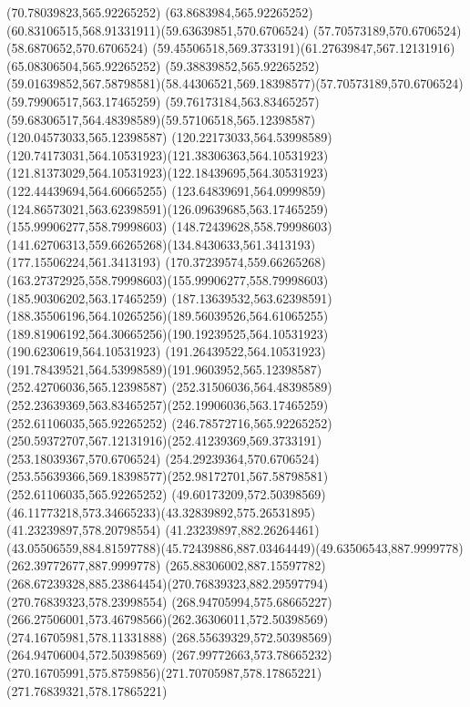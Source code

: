 {{		\lineto(70.78039823,565.92265252)
		\curveto(63.8683984,565.92265252)(60.83106515,568.91331911)(59.63639851,570.6706524)
		\closepath
		\moveto(57.70573189,570.6706524)
		\lineto(58.6870652,570.6706524)
		\curveto(59.45506518,569.3733191)(61.27639847,567.12131916)(65.08306504,565.92265252)
		\lineto(59.38839852,565.92265252)
		\curveto(59.01639852,567.58798581)(58.44306521,569.18398577)(57.70573189,570.6706524)
		\moveto(59.79906517,563.17465259)
		\curveto(59.76173184,563.83465257)(59.68306517,564.48398589)(59.57106518,565.12398587)
		\lineto(120.04573033,565.12398587)
		\curveto(120.22173033,564.53998589)(120.74173031,564.10531923)(121.38306363,564.10531923)
		\curveto(121.81373029,564.10531923)(122.18439695,564.30531923)(122.44439694,564.60665255)
		\curveto(123.64839691,564.0999859)(124.86573021,563.62398591)(126.09639685,563.17465259)
		\closepath
		\moveto(155.99906277,558.79998603)
		\curveto(148.72439628,558.79998603)(141.62706313,559.66265268)(134.8430633,561.3413193)
		\lineto(177.15506224,561.3413193)
		\curveto(170.37239574,559.66265268)(163.27372925,558.79998603)(155.99906277,558.79998603)
		\moveto(185.90306202,563.17465259)
		\curveto(187.13639532,563.62398591)(188.35506196,564.10265256)(189.56039526,564.61065255)
		\curveto(189.81906192,564.30665256)(190.19239525,564.10531923)(190.6230619,564.10531923)
		\curveto(191.26439522,564.10531923)(191.78439521,564.53998589)(191.9603952,565.12398587)
		\lineto(252.42706036,565.12398587)
		\curveto(252.31506036,564.48398589)(252.23639369,563.83465257)(252.19906036,563.17465259)
		\closepath
		\moveto(252.61106035,565.92265252)
		\lineto(246.78572716,565.92265252)
		\curveto(250.59372707,567.12131916)(252.41239369,569.3733191)(253.18039367,570.6706524)
		\lineto(254.29239364,570.6706524)
		\curveto(253.55639366,569.18398577)(252.98172701,567.58798581)(252.61106035,565.92265252)
		\moveto(49.60173209,572.50398569)
		\curveto(46.11773218,573.34665233)(43.32839892,575.26531895)(41.23239897,578.20798554)
		\lineto(41.23239897,882.26264461)
		\curveto(43.05506559,884.81597788)(45.72439886,887.03464449)(49.63506543,887.9999778)
		\lineto(262.39772677,887.9999778)
		\curveto(265.88306002,887.15597782)(268.67239328,885.23864454)(270.76839323,882.29597794)
		\lineto(270.76839323,578.23998554)
		\curveto(268.94705994,575.68665227)(266.27506001,573.46798566)(262.36306011,572.50398569)
		\closepath
		\moveto(274.16705981,578.11331888)
		\lineto(268.55639329,572.50398569)
		\lineto(264.94706004,572.50398569)
		\curveto(267.99772663,573.78665232)(270.16705991,575.8759856)(271.70705987,578.17865221)
		\lineto(271.76839321,578.17865221)
}}
